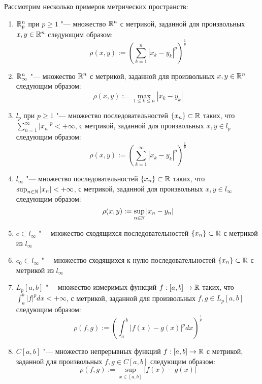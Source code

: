 \begin{example}
	Рассмотрим несколько примеров метрических пространств:
	\begin{enumerate}
		\item $\mathbb{R}^n_p$ при $p \ge 1$ "--- множество $\mathbb{R}^n$ с метрикой, заданной для произвольных $x, y \in \mathbb{R}^n$ сле\-дующим образом:
		\[\rho(x, y) := \left(\sum_{k = 1}^n|x_k - y_k|^p\right)^{\frac 1p}\]
  
		\item $\mathbb{R}^n_\infty$ "--- множество $\mathbb{R}^n$ с метрикой, заданной для произвольных $x, y \in \mathbb{R}^n$ следующим образом:
		\[\rho(x, y) := \max_{1 \le k \le n}|x_k - y_k|\]
  
		\item $l_p$ при $p \ge 1$ "--- множество последовательностей $\{x_n\} \subset \mathbb{R}$ таких, что $\sum_{n = 1}^\infty |x_n|^p < +\infty$, с метрикой, заданной для произвольных $x, y \in l_p$ следующим образом:
		\[\rho(x, y) := \left(\sum_{k = 1}^\infty|x_k - y_k|^p\right)^{\frac 1p}\]
  
		\item $l_\infty$ "--- множество последовательностей $\{x_n\} \subset \mathbb{R}$ таких, что $\sup_{n \in \mathbb{N}} |x_n| < +\infty$, с метрикой, заданной для произвольных $x, y \in l_\infty$ следующим образом:
		\[\rho(x, y) := \sup_{n \in \mathbb{N}}|x_n - y_n|\]

		\item $c \subset l_\infty$ "--- множество сходящихся последовательностей $\{x_n\} \subset \mathbb{R}$ с метрикой из $l_\infty$

		\item $c_0 \subset l_\infty$ "--- множество сходящихся к нулю последовательностей $\{x_n\} \subset \mathbb{R}$ с метрикой из $l_\infty$
  
		\item $L_p[a, b]$ "--- множество измеримых функций $f : [a, b] \to \mathbb{R}$ таких, что $\int_a^b |f|^pdx < + \infty$, с метрикой, заданной для произвольных $f, g \in L_p[a, b]$ следующим образом:
		\[\rho(f, g) := \left(\int_a^b |f(x) - g(x)|^pdx\right)^{\frac 1p}\]

		\item $C[a, b]$ "--- множество непрерывных функций $f : [a, b] \to \mathbb{R}$ с метрикой, заданной для произвольных $f, g \in C[a, b]$ следующим образом:
		\[\rho(f, g) := \sup_{x \in [a, b]}|f(x) - g(x)|\]
	\end{enumerate}
\end{example}

